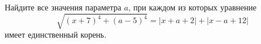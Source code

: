 \begin{ex}
	\begin{condition}
		Найдите все значения параметра \( a \), при каждом из которых уравнение \[ \sqrt{(x+7)^4+(a-5)^4}=|x+a+2|+|x-a+12| \] имеет единственный корень.
	\end{condition}
\end{ex}